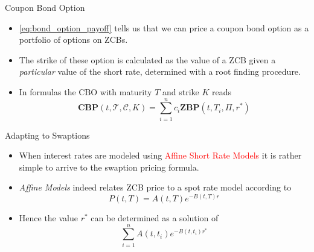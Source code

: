 \documentclass{beamer}
\begin{document}
\begin{frame}{Coupon Bond Option}
\begin{itemize}
	\item \cref{eq:bond_option_payoff} tells us that we can price a coupon bond option as a portfolio of options on ZCBs.
	\item The strike of these option is calculated as the value of a ZCB given a \emph{particular} value of the short rate, determined with a root finding procedure.
	\item In formulas the CBO with maturity $T$ and strike $K$ reads
	\begin{equation}
		\textbf{CBP}(t,\mathcal{T},\mathcal{C},K) = \sum_{i=1}^n c_i \textbf{ZBP}(t,T_i,\Pi,r^*)
	\end{equation}
\end{itemize}
\end{frame}

\begin{frame}{Adapting to Swaptions}
\begin{itemize}
	\item When interest rates are modeled using \textcolor{red}{Affine Short Rate Models} it is rather simple to arrive to the swaption pricing formula.
	\item \emph{Affine Models} indeed relates ZCB price to a spot rate model according to 
	\begin{equation*}
		P(t,T) = A(t,T)e^{-B(t,T)r}
	\end{equation*} 
	\item Hence the value $r^*$ can be determined as a solution of 
	\begin{equation*}
		\sum_{i=1}^n A(t,t_i)e^{-B(t,t_i)r^*}
	\end{equation*}		
\end{itemize}
\end{frame}
\end{document}
